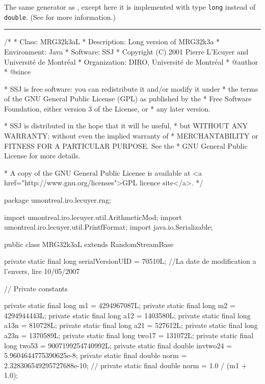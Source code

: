 

The same generator as , except here it is implemented
with type \texttt{long} instead of \texttt{double}.
(See  for more information.)


\bigskip\hrule

\begin{code}
\begin{hide}
/*
 * Class:        MRG32k3aL
 * Description:  Long version of MRG32k3a
 * Environment:  Java
 * Software:     SSJ 
 * Copyright (C) 2001  Pierre L'Ecuyer and Université de Montréal
 * Organization: DIRO, Université de Montréal
 * @author       
 * @since

 * SSJ is free software: you can redistribute it and/or modify it under
 * the terms of the GNU General Public License (GPL) as published by the
 * Free Software Foundation, either version 3 of the License, or
 * any later version.

 * SSJ is distributed in the hope that it will be useful,
 * but WITHOUT ANY WARRANTY; without even the implied warranty of
 * MERCHANTABILITY or FITNESS FOR A PARTICULAR PURPOSE.  See the
 * GNU General Public License for more details.

 * A copy of the GNU General Public License is available at
   <a href="http://www.gnu.org/licenses">GPL licence site</a>.
 */
\end{hide}
package umontreal.iro.lecuyer.rng; \begin{hide}

import umontreal.iro.lecuyer.util.ArithmeticMod;
import umontreal.iro.lecuyer.util.PrintfFormat;
import java.io.Serializable;
\end{hide}

public class MRG32k3aL extends RandomStreamBase \begin{hide} {

   private static final long serialVersionUID = 70510L;
   //La date de modification a l'envers, lire 10/05/2007

   // Private constants   %

   private static final long   m1     = 4294967087L;
   private static final long   m2     = 4294944443L;
   private static final long   a12    =  1403580L;
   private static final long   a13n   =   810728L;
   private static final long   a21    =   527612L;
   private static final long   a23n   =  1370589L;
   private static final long   two17  =   131072L;
   private static final long   two53  =  9007199254740992L;
   private static final double invtwo24 = 5.9604644775390625e-8;
   private static final double norm   = 2.328306549295727688e-10;
   //    private static final double norm   = 1.0 / (m1 + 1.0);


}
\end{hide}
\end{code}
